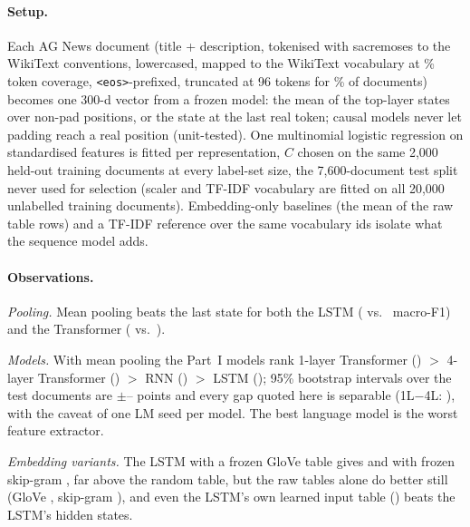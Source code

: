 \documentclass[10pt,a4paper]{article}
\begin{document}
\paragraph{Setup.} Each AG News \citep{zhang2015character} document (title + description, tokenised with sacremoses \citep{koehn2007moses} to the WikiText conventions, lowercased, mapped to the WikiText vocabulary at \agInVocab\% token coverage, \texttt{<eos>}-prefixed, truncated at 96 tokens for \agTruncated\% of documents) becomes one 300-d vector from a frozen model: the mean of the top-layer states over non-pad positions, or the state at the last real token; causal models never let padding reach a real position (unit-tested). One multinomial logistic regression \citep{pedregosa2011scikit} on standardised features is fitted per representation, $C$ chosen on the same 2,000 held-out training documents at every label-set size, the 7,600-document test split never used for selection (scaler and TF-IDF vocabulary are fitted on all 20,000 unlabelled training documents). Embedding-only baselines (the mean of the raw table rows) and a TF-IDF reference over the same vocabulary ids isolate what the sequence model adds.

\paragraph{Observations.}
\emph{Pooling.} Mean pooling beats the last state for both the LSTM (\fOneLstmRandMean{} vs.\ \fOneLstmRandLast{} macro-F1) and the Transformer (\fOneTransformerRandMean{} vs.\ \fOneTransformerRandLast).

\emph{Models.} With mean pooling the Part~I models rank 1-layer Transformer (\fOneTransformerOnelRandMean) $>$ 4-layer Transformer (\fOneTransformerRandMean) $>$ RNN (\fOneRnnRandMean) $>$ LSTM (\fOneLstmRandMean); 95\% bootstrap intervals over the test documents are $\pm$\ciHalfMin--\ciHalfMax{} points and every gap quoted here is separable (1L$-$4L: \pdTransformerOnelRandMeanVsTransformerRandMean), with the caveat of one LM seed per model. The best language model is the worst feature extractor.

\emph{Embedding variants.} The LSTM with a frozen GloVe table gives \fOneLstmGloveFrozenMean{} and with
frozen skip-gram \fOneLstmSkipgramFrozenMean, far above the random table, but the raw tables alone do
better still (GloVe \fOneEmbGloveMean, skip-gram \fOneEmbSkipgramMean), and even the LSTM's own learned
input table (\fOneEmbRandLearnedMean) beats the LSTM's hidden states.
\end{document}
